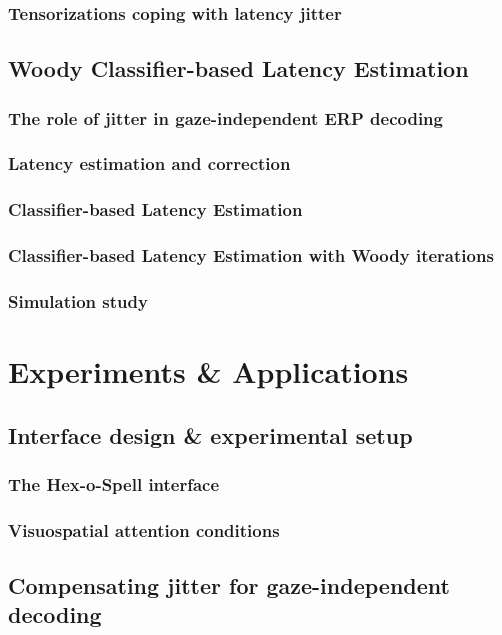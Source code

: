 \section{Tensorizations coping with latency jitter}

\chapter{Woody Classifier-based Latency Estimation}
\section{The role of jitter in gaze-independent ERP decoding}
\section{Latency estimation and correction}
\section{Classifier-based Latency Estimation}
\section{Classifier-based Latency Estimation with Woody iterations}
\section{Simulation study}

\part{Experiments \& Applications}

\chapter{Interface design \& experimental setup}
\section{The Hex-o-Spell interface}
\section{Visuospatial attention conditions}

\chapter{Compensating jitter for gaze-independent decoding}
